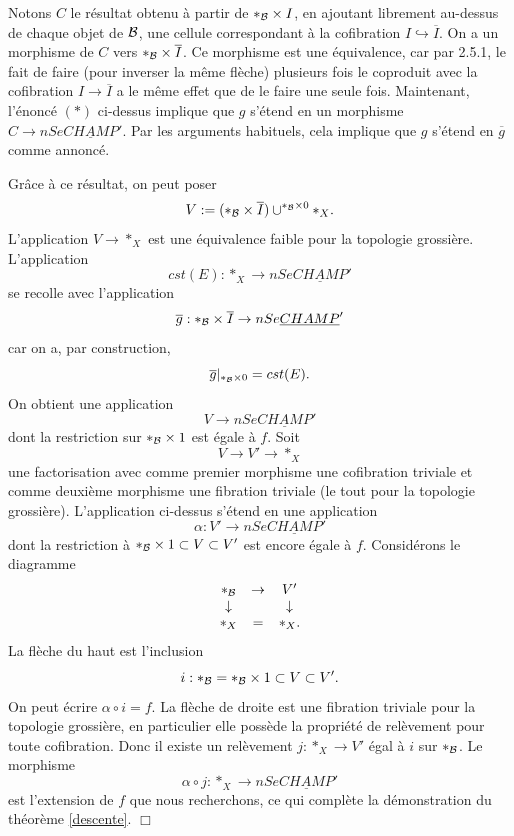 \documentclass[12pt]{article}
\newcommand{\eop}{\hfill $\Box$\vspace{.1in}}
\newcommand{\Bb}{{\cal B}}
\begin{document}
Notons $C$ le r\'esultat obtenu \`a
partir de $\ast _{\Bb} \times I$, en ajoutant librement
au-dessus de chaque objet de $\Bb$, une cellule correspondant \`a la cofibration
$I\hookrightarrow \overline{I}$. On a un morphisme de $C$ vers
$\ast_{\Bb} \times \overline{I}$. Ce morphisme est une \'equivalence, car par
\cite{limits} 2.5.1, le fait de faire (pour inverser la m\^eme fl\`eche)
plusieurs fois le coproduit avec la cofibration $I\rightarrow
\overline{I}$ a le m\^eme effet que de le faire une seule fois.
Maintenant, l'\'enonc\'e $(\ast )$ ci-dessus implique que $g$ s'\'etend en un
morphisme $C\rightarrow nSe\underline{CHAMP}'$. Par les arguments habituels,
cela implique que $g$ s'\'etend en $\overline{g}$ comme annonc\'e.

Gr\^ace \`a ce r\'esultat, on peut poser
$$
V:= (\ast _{\Bb}\times \overline{I}) \cup ^{\ast _{\Bb} \times 0}\ast _X.
$$
L'application $V\rightarrow \ast _X$ est une \'equivalence faible pour la
topologie grossi\`ere. L'application
$$
cst(E): \ast _X \rightarrow nSe\underline{CHAMP}'
$$
se recolle avec l'application
$$
\overline{g}: \ast _{\Bb} \times \overline{I} \rightarrow
nSe\underline{CHAMP}'
$$
car on a, par construction,
$$
\overline{g}|_{\ast _{\Bb} \times 0} = cst(E).
$$
On obtient une application
$$
V\rightarrow nSe\underline{CHAMP}'
$$
dont la restriction sur $\ast _{\Bb} \times 1$ est \'egale \`a $f$.
Soit
$$
V\rightarrow V' \rightarrow \ast _X
$$
une factorisation avec comme premier morphisme une cofibration triviale et
comme
deux\-i\`eme morphisme une fibration triviale (le
tout pour la topologie grossi\`ere).
L'application ci-dessus s'\'etend en une application
$$
\alpha : V'\rightarrow nSe\underline{CHAMP}'
$$
dont la restriction \`a
$\ast _{\Bb} \times 1\subset V \subset V'$ est encore \'egale \`a $f$.
Consid\'erons le diagramme
$$
\begin{array}{ccc}
\ast _{\Bb} & \rightarrow & V' \\
\downarrow && \downarrow \\
\ast _X & = & \ast _X.
\end{array}
$$
La fl\`eche du haut est l'inclusion
$$
i: \ast _{\Bb}=\ast _{\Bb} \times 1\subset V
\subset V'.
$$
On peut \'ecrire $\alpha \circ i = f$.
La fl\`eche de droite est une fibration triviale pour la topologie grossi\`ere,
en particulier elle poss\`ede la propri\'et\'e de rel\`evement pour toute
cofibration.
Donc il existe un rel\`evement $j:\ast _X\rightarrow V'$ \'egal \`a
$i$ sur $\ast _{\Bb}$.   Le morphisme
$$
\alpha \circ j: \ast _X \rightarrow nSe\underline{CHAMP}'
$$
est l'extension de $f$ que nous recherchons, ce qui compl\`ete la
d\'emonstration
du th\'eor\`eme \ref{descente}.
\eop
\end{document}
